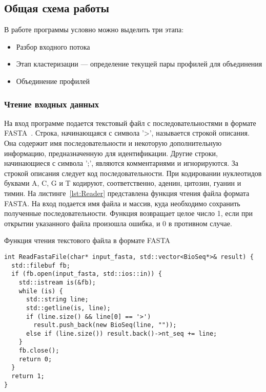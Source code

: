 \subsection[Общая схема работы]{\large Общая схема работы}
\hspace{\parindent} В работе программы условно можно выделить три этапа: 
\begin{itemize}
\item Разбор входного потока
\item Этап кластеризации --- определение текущей пары профилей для объединения
\item Объединение профилей
\end{itemize}

\subsubsection[Чтение входных данных]{\large Чтение входных данных}
\hspace{\parindent} На вход программе подается текстовый файл с последовательностями в формате FASTA~\cite{FASTAformat}. Строка, начинающаяся с символа '>', называется строкой описания. Она содержит имя последовательности и некоторую дополнительную информацию, предназначенную для идентификации. Другие строки, начинающиеся с символа ';', являются комментариями и игнорируются. За строкой описания следует код последовательности. При кодировании нуклеотидов буквами A, C, G и T кодируют, соответственно, аденин, цитозин, гуанин и тимин. На листинге~\ref{lst:Reader} представлена функция чтения файла формата FASTA. На вход подается имя файла и массив, куда необходимо сохранить полученные последовательности. Функция возвращает целое число 1, если при открытии указанного файла произошла ошибка, и 0 в противном случае.
\begin{algorithm}
	\caption{Функция чтения текстового файла в формате FASTA} \label{lst:Reader}
	\begin{lstlisting}
int ReadFastaFile(char* input_fasta, std::vector<BioSeq*>& result) {
  std::filebuf fb;
  if (fb.open(input_fasta, std::ios::in)) {
    std::istream is(&fb);
    while (is) {
      std::string line;
      std::getline(is, line);
      if (line.size() && line[0] == '>') 
        result.push_back(new BioSeq(line, ""));
      else if (line.size()) result.back()->nt_seq += line;
    }
    fb.close();
    return 0;
  } 
  return 1;
}
	\end{lstlisting}
\end{algorithm}

